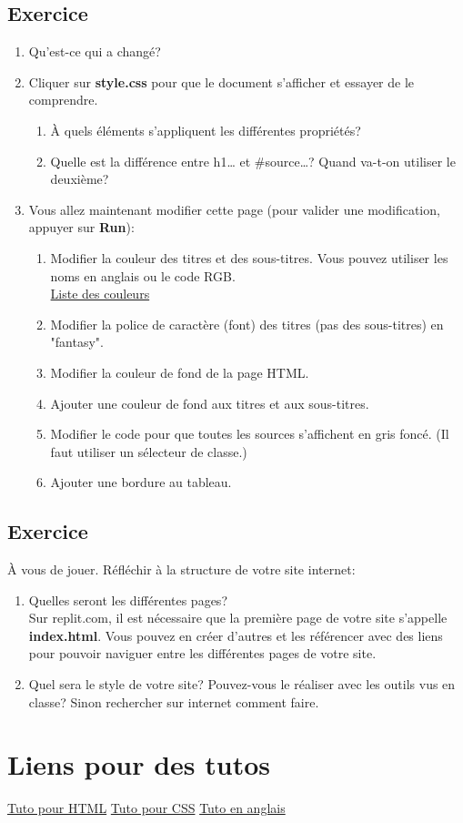 \documentclass[a4paper,11pt]{article}
\begin{document}
\subsection{Exercice}
\begin{enumerate}
\item Qu'est-ce qui a changé?
\item Cliquer sur \textbf{style.css} pour que le document s'afficher et essayer de le comprendre.
\begin{enumerate}
  \item À quels éléments s'appliquent les différentes propriétés?
  \item Quelle est la différence entre h1{\dots} et \#source{\dots}? Quand va-t-on utiliser le deuxième?
\end{enumerate}
\item Vous allez maintenant modifier cette page (pour valider une modification, appuyer sur \textbf{Run}):
\begin{enumerate}
  \item Modifier la couleur des titres et des sous-titres. Vous pouvez utiliser les noms en anglais ou le code RGB.\\
  \href{https://www.rapidtables.com/web/color/RGB_Color.html}{Liste des couleurs}
  \item Modifier la police de caractère (font) des titres (pas des sous-titres) en  "fantasy".
  \item Modifier la couleur de fond de la page HTML.
  \item Ajouter une couleur de fond aux titres et aux sous-titres.
  \item Modifier le code pour que toutes les sources s'affichent en gris foncé. (Il faut utiliser un sélecteur de classe.)
  \item Ajouter une bordure au tableau.
\end{enumerate}
\end{enumerate}

\subsection{Exercice}
À vous de jouer. Réfléchir à la structure de votre site internet:
\begin{enumerate}
\item Quelles seront les différentes pages?\\
Sur replit.com, il est nécessaire que la première page de votre site s'appelle \textbf{index.html}. Vous pouvez en créer d'autres et les référencer avec des liens pour pouvoir naviguer entre les différentes pages de votre site.
\item Quel sera le style de votre site? Pouvez-vous le réaliser avec les outils vus en classe? Sinon rechercher sur internet comment faire.
\end{enumerate}

\section{Liens pour des tutos}
\href{https://developer.mozilla.org/fr/docs/Web/HTML}{Tuto pour HTML}
\href{https://developer.mozilla.org/fr/docs/Web/CSS}{Tuto pour CSS}
\href{https://www.w3schools.com/ }{Tuto en anglais}
\end{document}
